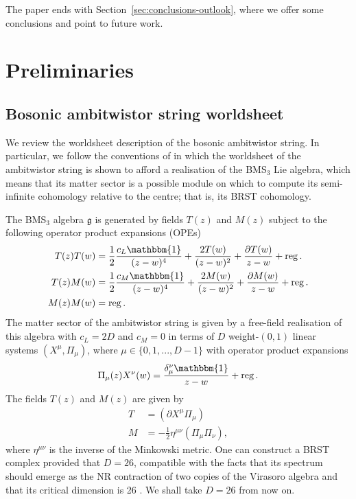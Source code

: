 \documentclass[11pt,reqno,a4paper,final]{amsart}
\theoremstyle{plain}
\theoremstyle{definition}
\newcommand{\g}{\mathfrak{g}}
\newcommand{\reg}{\operatorname{reg}}
\newcommand{\1}{\mathbb{1}}
\numberwithin{equation}{section}
\begin{document}
The paper ends with Section~\ref{sec:conclusions-outlook}, where we
offer some conclusions and point to future work.


\section{Preliminaries} \label{sec:preliminaries}

\subsection{Bosonic ambitwistor string worldsheet}
\label{sec:bosonic-ambi}

We review the worldsheet description of the bosonic ambitwistor
string. In particular, we follow the conventions of
\cite{Figueroa-OFarrill:2024wgs} in which the worldsheet of the
ambitwistor string is shown to afford a realisation of the BMS$_3$ Lie
algebra, which means that its matter sector is a possible module on
which to compute its semi-infinite cohomology relative to the centre;
that is, its BRST cohomology.

The BMS$_3$ algebra $\g$ is generated by fields $T(z)$ and $M(z)$
subject to the following operator product expansions (OPEs)
\begin{equation}
  \begin{split}
    T(z)T(w) &= \frac{1}{2}\frac{c_L\mathbbm{1}}{(z-w)^4} + \frac{2T(w)}{(z-w)^2} + \frac{\partial T(w)}{z-w} + \reg.\\
    T(z)M(w) &= \frac{1}{2}\frac{c_M \mathbbm{1}}{(z-w)^4} + \frac{2 M(w)}{(z-w)^2} + \frac{\partial M(w)}{z-w} + \reg.\\
    M(z)M(w) &= \reg.
  \end{split}
\end{equation}
The matter sector of the ambitwistor string is given by a free-field
realisation of this algebra with $c_L = 2D$ and $c_M=0$ in terms of
$D$ weight-$(0,1)$ linear systems $(X^\mu, \Pi_\mu)$, where
$\mu\in\{0,1,...,D-1\}$ with operator product expansions
\begin{equation} \label{eq:X-Pi defining OPEs}
  \Pi_\mu(z) X^\nu (w) = \frac{\delta^\nu_\mu \mathbbm{1}}{z-w} + \reg.
\end{equation}
The fields $T(z)$ and $M(z)$ are given by
\begin{equation}
  \label{eq:T-and-M}
  \begin{split}
    T &= (\partial X^\mu \Pi_\mu)\\
    M &= - \tfrac12 \eta^{\mu\nu}(\Pi_\mu\Pi_\nu),
  \end{split}
\end{equation}
where $\eta^{\mu\nu}$ is the inverse of the Minkowski metric.  One can
construct a BRST complex provided that $D=26$, compatible with the
facts that its spectrum should emerge as the NR contraction of two
copies of the Virasoro algebra \cite{CampoleoniGonzalezOblakRiegler,
  Bagchi:2020fpr} and that its critical dimension is 26
\cite{MasonSkinner, Casali:2016atr, Bagchi:2020fpr}.  We shall take
$D=26$ from now on.
\end{document}
